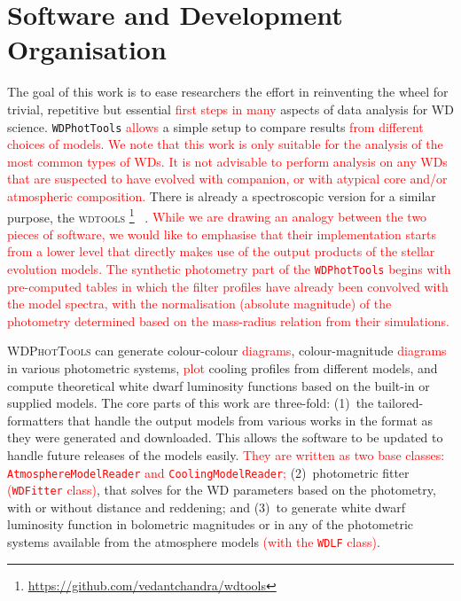 \documentclass[fleqn,usenatbib]{rasti}
\begin{document}
\section{Software and Development Organisation}
The goal of this work is to ease researchers the effort in reinventing the
wheel for trivial, repetitive but essential \textcolor{red}{first \textcolor{red}{steps} in many}
aspects of data analysis for WD science. \texttt{WDPhotTools} \textcolor{red}{allows} a simple
setup to compare results \textcolor{red}{from different choices of models. We note that this work is only suitable for the analysis of the
most common types of WDs. It is not advisable to perform analysis on any WDs
that are suspected to have evolved with companion, or with atypical core
and/or atmospheric composition.}
There is already a spectroscopic version for a similar purpose, the
\textsc{wdtools} \footnote{\url{https://github.com/vedantchandra/wdtools}}~
\citep{2020MNRAS.497.2688C}. \textcolor{red}{While we are drawing
an analogy between the two pieces of software, we would like to emphasise that their
implementation starts from a lower level that directly makes use of the
output products of the stellar evolution models. The synthetic
photometry part of the \texttt{WDPhotTools} begins with pre-computed
tables in which the filter profiles have already been convolved with the model
spectra, with the normalisation (absolute magnitude) of the photometry
determined based on the mass-radius relation from their simulations.}

\textsc{WDPhotTools} can generate colour-colour \textcolor{red}{diagrams}, colour-magnitude
\textcolor{red}{diagrams} in various photometric systems, \textcolor{red}{plot} cooling profiles from
different models, and compute theoretical white dwarf luminosity functions
based on the built-in or supplied models. The core parts of this work are
three-fold: (1)~the tailored-formatters that handle the output models from
various works in the format as they were generated and downloaded. This allows
the software to be updated to handle future releases of the models easily.
\textcolor{red}{They are written as two base classes:
\texttt{AtmosphereModelReader} and \texttt{CoolingModelReader};}
(2)~photometric fitter \textcolor{red}{(\texttt{WDFitter} class)}, that solves for
the WD parameters based on the photometry, with or without distance and
reddening; and (3)~to generate white dwarf luminosity function in
bolometric magnitudes or in any of the photometric systems available from the
atmosphere models \textcolor{red}{(with the \texttt{WDLF} class)}.
\end{document}
